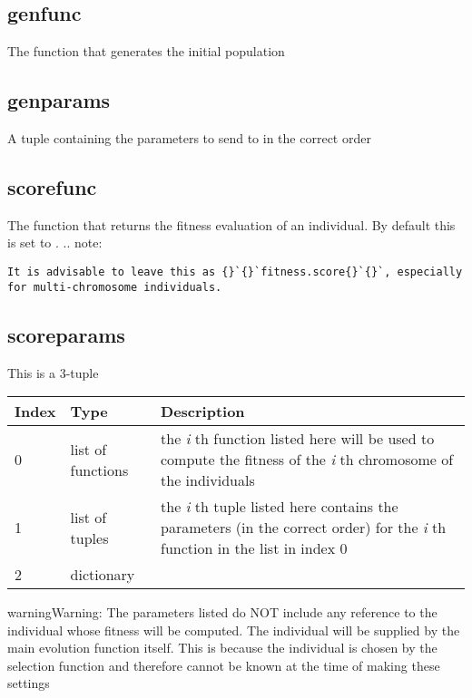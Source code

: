 \documentclass[letterpaper,10pt,english]{sphinxmanual}
\begin{document}
\subsection{genfunc}
\label{settings.py:genfunc}
The function that generates the initial population


\subsection{genparams}
\label{settings.py:genparams}
A tuple containing the parameters to send to  in the correct order


\subsection{scorefunc}
\label{settings.py:scorefunc}
The function that returns the fitness evaluation of an individual. By default this is set to .
.. note:

\begin{Verbatim}[commandchars=\\\{\}]
It is advisable to leave this as {}`{}`fitness.score{}`{}`, especially for multi-chromosome individuals.
\end{Verbatim}


\subsection{scoreparams}
\label{settings.py:scoreparams}
This is a 3-tuple

\begin{tabulary}{\linewidth}{|L|L|L|}
\hline
\textbf{
Index
} & \textbf{
Type
} & \textbf{
Description
}\\\hline

0
 & 
list of functions
 & 
the \emph{i} th function listed here will be used to compute the fitness of the \emph{i} th chromosome of the individuals
\\\hline

1
 & 
list of tuples
 & 
the \emph{i} th tuple listed here contains the parameters (in the correct order) for the \emph{i} th function in the list in index 0
\\\hline

2
 & 
dictionary
 & 
\\\hline
\end{tabulary}


\begin{notice}{warning}{Warning:}
The parameters listed do NOT include any reference to the individual whose fitness will be computed. The individual will be supplied by the main evolution function itself. This is because the individual is chosen by the selection function and therefore cannot be known at the time of making these settings
\end{notice}
\end{document}
